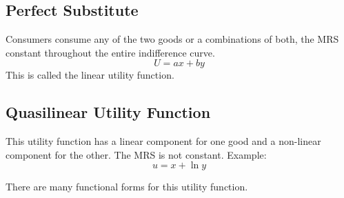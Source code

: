 \documentclass[../ECON-281-Notes.tex]{subfiles}
\begin{document}
\subsection{Perfect Substitute}
Consumers consume any of the two goods or a combinations of both, the MRS constant throughout the entire indifference curve.
\begin{equation}
  U = ax + by
\end{equation}
This is called the linear utility function.

\subsection{Quasilinear Utility Function}
This utility function has a linear component for one good and a non-linear component for the other. The MRS is not constant.
Example:
\[ 
u = x + \ln y 
\] 

There are many functional forms for this utility function.
\end{document}
